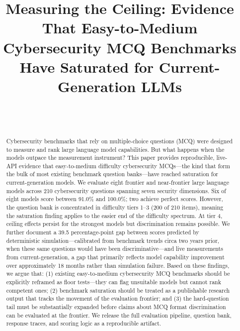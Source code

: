 \documentclass[journal]{IEEEtran}
\begin{document}
\title{Measuring the Ceiling: Evidence That Easy-to-Medium Cybersecurity MCQ Benchmarks Have Saturated for Current-Generation LLMs}

\author{
    \\[6pt]
    \\
}

\maketitle

\begin{abstract}
Cybersecurity benchmarks that rely on multiple-choice questions (MCQ) were designed to measure and rank large language model capabilities. But what happens when the models outpace the measurement instrument? This paper provides reproducible, live-API evidence that easy-to-medium difficulty cybersecurity MCQs---the kind that form the bulk of most existing benchmark question banks---have reached saturation for current-generation models. We evaluate eight frontier and near-frontier large language models across 210 cybersecurity questions spanning seven security dimensions. Six of eight models score between 91.0\% and 100.0\%; two achieve perfect scores. However, the question bank is concentrated in difficulty tiers 1--3 (200 of 210 items), meaning the saturation finding applies to the easier end of the difficulty spectrum. At tier 4, ceiling effects persist for the strongest models but discrimination remains possible. We further document a 39.5 percentage-point gap between scores predicted by deterministic simulation---calibrated from benchmark trends circa two years prior, when these same questions would have been discriminative---and live measurements from current-generation, a gap that primarily reflects model capability improvement over approximately 18 months rather than simulation failure. Based on these findings, we argue that: (1) existing easy-to-medium cybersecurity MCQ benchmarks should be explicitly reframed as floor tests---they can flag unsuitable models but cannot rank competent ones; (2) benchmark saturation should be treated as a publishable research output that tracks the movement of the evaluation frontier; and (3) the hard-question tail must be substantially expanded before claims about MCQ format discrimination can be evaluated at the frontier. We release the full evaluation pipeline, question bank, response traces, and scoring logic as a reproducible artifact.
\end{abstract}
\end{document}
